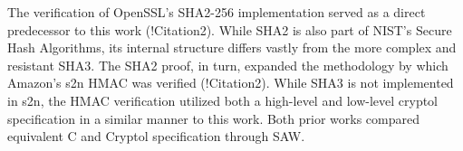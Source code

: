 The verification of OpenSSL's SHA2-256 implementation served as a direct predecessor to this work (!Citation2).
While SHA2 is also part of NIST's Secure Hash Algorithms, its internal structure differs vastly from the more complex and resistant SHA3.
The SHA2 proof, in turn, expanded the methodology by which Amazon's s2n HMAC was verified (!Citation2).
While SHA3 is not implemented in s2n, the HMAC verification utilized both a high-level and low-level cryptol specification in a similar manner to this work.
Both prior works compared equivalent C and Cryptol specification through SAW.